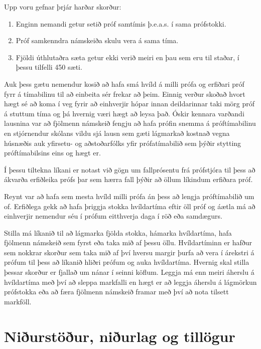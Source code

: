 \documentclass[12pt]{article}
\begin{document}
Upp voru gefnar þrjár harðar skorður:
\begin{enumerate}
	\item Enginn nemandi getur setið próf samtímis þ.e.a.s. í sama prófstokki.
	\item Próf samkenndra námskeiða skulu vera á sama tíma.
	\item Fjöldi úthlutaðra sæta getur ekki verið meiri en þau sem eru til staðar, í þessu tilfelli 450 sæti.
\end{enumerate}


Auk þess gætu nemendur kosið að hafa smá hvíld á milli prófa og erfiðari próf fyrr á tímabilinu til að einbeita sér frekar að þeim. Einnig verður skoðað hvort hægt sé að koma í veg fyrir að einhverjir hópar innan deildarinnar taki mörg próf á stuttum tíma og þá hvernig væri hægt að leysa það. Óskir kennara varðandi lausnina var að fjölmenn námskeið fengju að hafa prófin snemma á próftímabilinu en stjórnendur skólans vildu sjá lausn sem gæti lágmarkað kostnað vegna húsnæðis auk yfirsetu- og aðstoðarfólks yfir prófatímabilið sem þýðir stytting próftímabilsins eins og hægt er.

\medskip

Í þessu tiltekna líkani er notast við gögn um fallprósentu frá prófstjóra til þess að ákvarða erfiðleika prófs þar sem hærra fall þýðir að öllum líkindum erfiðara próf.

\medskip

Reynt var að hafa sem mesta hvíld milli prófa án þess að lengja próftímabilið um of. Erfiðlega gekk að hafa 
þriggja stokka hvíldartíma eftir öll próf og áætla má að einhverjir nemendur séu í prófum eitthverja daga í röð eða samdægurs.

\medskip


Stilla má líkanið til að lágmarka fjölda stokka, hámarka hvíldartíma, hafa fjölmenn námskeið sem fyrst eða taka mið af þessu öllu. Hvíldartíminn er hafður sem nokkrar skorður sem taka mið af því hversu margir þurfa að vera í árekstri á prófum til þess að líkanið hliðri prófum og auka hvíldartíma. Hvernig skal stilla þessar skorður er fjallað um nánar í seinni köflum. Leggja má enn meiri áherslu á hvíldartíma með því að sleppa markfalli en hægt er að leggja áherslu á lágmörkun prófstokka eða að færa fjölmenn námskeið framar með því að nota tilsett markföll.


\newpage	

\section{Niðurstöður, niðurlag og tillögur}
\end{document}
